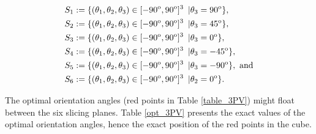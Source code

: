 \begin{align}
&S_1:= \{(\theta_1,\theta_2,\theta_3)\in [-90^\mathrm{o},90^\mathrm{o}]^3 \enskip|\theta_3=90^\mathrm{o}\}, \\
&S_2:= \{(\theta_1,\theta_2,\theta_3)\in [-90^\mathrm{o},90^\mathrm{o}]^3 \enskip|\theta_3=45^\mathrm{o}\}, \\
&S_3:= \{(\theta_1,\theta_2,\theta_3)\in [-90^\mathrm{o},90^\mathrm{o}]^3 \enskip|\theta_3=0^\mathrm{o}\}, \\
&S_4:= \{(\theta_1,\theta_2,\theta_3)\in [-90^\mathrm{o},90^\mathrm{o}]^3 \enskip|\theta_3=-45^\mathrm{o}\},\\ 
&S_5:= \{(\theta_1,\theta_2,\theta_3)\in [-90^\mathrm{o},90^\mathrm{o}]^3 \enskip|\theta_3=-90^\mathrm{o}\}, \text{ and}\\ 
&S_6:= \{(\theta_1,\theta_2,\theta_3)\in [-90^\mathrm{o},90^\mathrm{o}]^3 \enskip|\theta_2=0^\mathrm{o}\}.
\end{align}

The optimal orientation angles (red points in Table \ref{table_3PV}) might float between the six slicing planes. Table \ref{opt_3PV} presents the exact values of the optimal orientation angles, hence the exact position of the red points in the cube. 



\newpage



